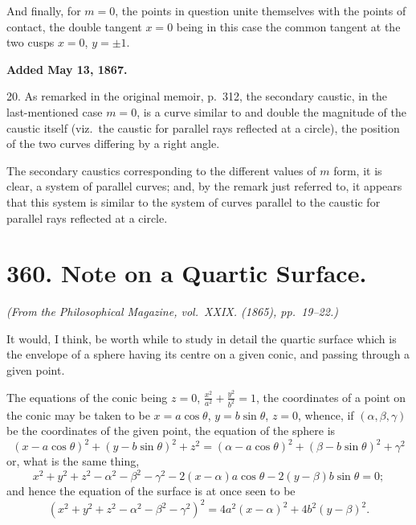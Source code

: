 \documentclass[11pt,a4paper]{article}
\theoremstyle{plain}
\begin{document}
And finally, for $m = 0$, the points in question unite themselves with the points of contact, the double tangent $x = 0$ being in this case the common tangent at the two cusps $x = 0$, $y = \pm 1$.

\smallskip

\textbf{Added May 13, 1867.}

20. As remarked in the original memoir, p.~312, the secondary caustic, in the last-mentioned case $m = 0$, is a curve similar to and double the magnitude of the caustic itself (viz.\ the caustic for parallel rays reflected at a circle), the position of the two curves differing by a right angle.

The secondary caustics corresponding to the different values of $m$ form, it is clear, a system of parallel curves; and, by the remark just referred to, it appears that this system is similar to the system of curves parallel to the caustic for parallel rays reflected at a circle.

\vspace{1cm}

\section*{360. Note on a Quartic Surface.\quad [360]}
\label{sec:360}

\begin{flushright}
\textit{(From the Philosophical Magazine, vol.~XXIX. (1865), pp.~19--22.)}
\end{flushright}

It would, I think, be worth while to study in detail the quartic surface which is the envelope of a sphere having its centre on a given conic, and passing through a given point.

The equations of the conic being $z = 0$, $\frac{x^2}{a^2} + \frac{y^2}{b^2} = 1$, the coordinates of a point on the conic may be taken to be $x = a\cos\theta$, $y = b\sin\theta$, $z = 0$, whence, if $(\alpha, \beta, \gamma)$ be the coordinates of the given point, the equation of the sphere is
\[
(x - a\cos\theta)^2 + (y - b\sin\theta)^2 + z^2 = (\alpha - a\cos\theta)^2 + (\beta - b\sin\theta)^2 + \gamma^2
\]
or, what is the same thing,
\[
x^2 + y^2 + z^2 - \alpha^2 - \beta^2 - \gamma^2 - 2(x - \alpha)a\cos\theta - 2(y - \beta)b\sin\theta = 0;
\]
and hence the equation of the surface is at once seen to be
\[
(x^2 + y^2 + z^2 - \alpha^2 - \beta^2 - \gamma^2)^2 = 4a^2(x - \alpha)^2 + 4b^2(y - \beta)^2.
\]
\end{document}
